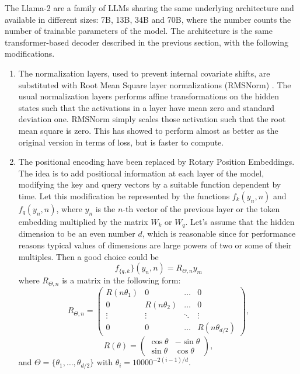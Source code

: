 \documentclass[]{marticle}
\begin{document}
The Llama-2 are a family of LLMs sharing the same underlying architecture and available in different
sizes: 7B, 13B, 34B and 70B, where the number counts the number of trainable parameters of the
model. The architecture is the same transformer-based decoder described in the previous section,
with the following modifications.
\begin{enumerate}
\item The normalization layers, used to prevent internal covariate shifts, are substituted with Root
Mean Square layer normalizations (RMSNorm) \cite{paper-rmsnorm}. The usual normalization layers
performs affine transformations on the hidden states such that the activations in a layer have mean
zero and standard deviation one. RMSNorm simply scales those activation such that the root mean
square is zero. This has showed to perform almost as better as the original version in terms of
loss, but is faster to compute.

\item The positional encoding have been replaced by Rotary Position Embeddings. The idea is to add
positional information at each layer of the model, modifying the key and query vectors by a
suitable function dependent by time. Let this modification be represented by the functions 
$f_k(y_n, n)$ and $f_q(y_n, n)$, where $y_n$ is the $n$-th vector of the previous layer or the
token embedding  multiplied by the matrix $W_k$ or $W_q$. Let's assume that the hidden dimension
to be an even number $d$, which is reasonable since for performance reasons typical values of
dimensions are large powers of two or some of their multiples. Then a good choice could be
$$ f_{\{q, k}\}(y_n, n) = R_{\Theta, n} y_m $$
where $R_{\Theta, n}$ is a matrix in the following form:
$$
    R_{\Theta, n} = \begin{pmatrix} 
      R(n \theta_1)& 0& \dots& 0 \\
      0& R(n \theta_2)& \dots& 0 \\
      \vdots& \vdots& \ddots& \vdots \\
      0&0& \dots& R(n \theta_{d / 2})
    \end{pmatrix},
$$
$$
    R(\theta) = \begin{pmatrix} 
        \cos\theta & -\sin\theta \\ \sin\theta & \cos\theta
    \end{pmatrix},
$$
and $\Theta = \{ \theta_1, \dots, \theta_{d / 2} \}$ with $\theta_i = 10000^{-2(i-1) / d}$.


\end{enumerate}
\end{document}
